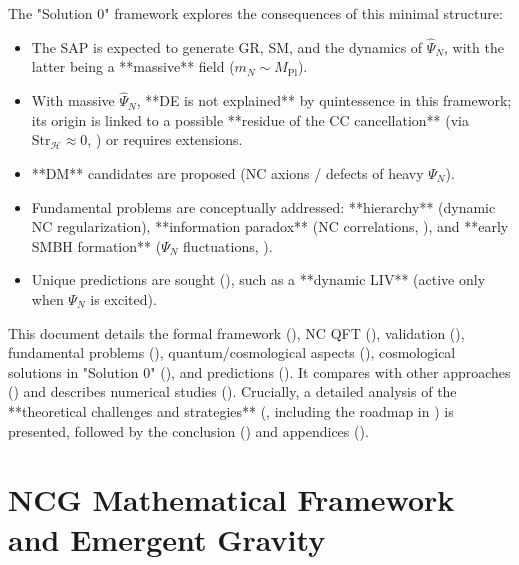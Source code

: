\documentclass[11pt, a4paper]{article}
\theoremstyle{remark}
\newcommand{\Op}[1]{\hat{#1}}
\newcommand{\Str}{\mathrm{Str}}
\newcommand{\Mpl}{M_{\mathrm{Pl}}}
\begin{document}
The "Solution 0" framework explores the consequences of this minimal structure:
\begin{itemize}[label=\textbullet, wide, labelwidth=!, labelindent=0pt]
    \item The SAP is expected to generate GR, SM, and the dynamics of \( \Op{\Psi}_N \), with the latter being a **massive** field (\( m_N \sim \Mpl \)).
    \item With massive \( \Op{\Psi}_N \), **DE is not explained** by quintessence in this framework; its origin is linked to a possible **residue of the CC cancellation** (via \( \Str_{\mathcal{H}} \approx 0 \), ) or requires extensions.
    \item **DM** candidates are proposed (NC axions / defects of heavy \( \Psi_N \)).
    \item Fundamental problems are conceptually addressed: **hierarchy** (dynamic NC regularization), **information paradox** (NC correlations, ), and **early SMBH formation** (\( \Psi_N \) fluctuations, ).
    \item Unique predictions are sought (), such as a **dynamic LIV** (active only when \( \Psi_N \) is excited).
\end{itemize}

This document details the formal framework (), NC QFT (), validation (), fundamental problems (), quantum/cosmological aspects (), cosmological solutions in "Solution 0" (), and predictions (). It compares with other approaches () and describes numerical studies (). Crucially, a detailed analysis of the **theoretical challenges and strategies** (, including the roadmap in ) is presented, followed by the conclusion () and appendices ().

\section{NCG Mathematical Framework and Emergent Gravity}
\label{sec:gnc_framework_final}
\end{document}
